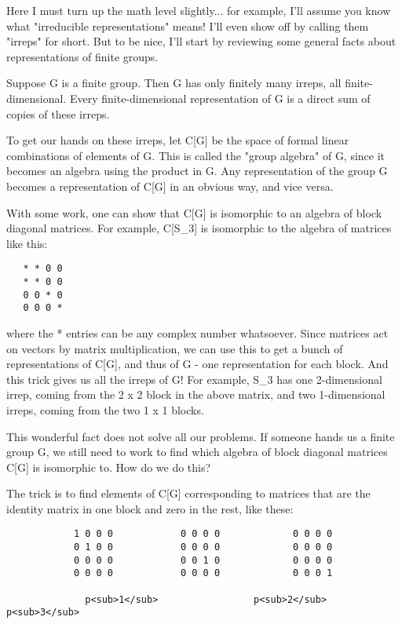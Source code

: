 Here I must turn up the math level slightly... for example, I'll assume
you know what "irreducible representations" means!  I'll even
show off by calling them "irreps" for short.  But to be nice,
I'll start by reviewing some general facts about representations of
finite groups.

Suppose G is a finite group.  Then G has only finitely many irreps, all
finite-dimensional.  Every finite-dimensional representation of G is a
direct sum of copies of these irreps.  

To get our hands on these irreps, let C[G] be the space of formal linear
combinations of elements of G.  This is called the "group
algebra" of G, since it becomes an algebra using the product in G.
Any representation of the group G becomes a representation of C[G] in an
obvious way, and vice versa.

With some work, one can show that C[G] is isomorphic to an algebra
of block diagonal matrices.  For example, C[S_{3}] is isomorphic to the
algebra of matrices like this:

\begin{verbatim}
   * * 0 0 
   * * 0 0
   0 0 * 0 
   0 0 0 *
\end{verbatim}
    
where the * entries can be any complex number whatsoever.  Since
matrices act on vectors by matrix multiplication, we can use this to get
a bunch of representations of C[G], and thus of G - one representation
for each block.  And this trick gives us all the irreps of G!  For
example, S_{3} has one 2-dimensional irrep, coming from the 2 x
2 block in the above matrix, and two 1-dimensional irreps, coming from
the two 1 x 1 blocks.

This wonderful fact does not solve all our problems.  If someone hands
us a finite group G, we still need to work to find which algebra of block
diagonal matrices C[G] is isomorphic to.  How do we do this?  

The trick is to find elements of C[G] corresponding to matrices that
are the identity matrix in one block and zero in the rest, like these:

\begin{verbatim}
            1 0 0 0            0 0 0 0             0 0 0 0 
            0 1 0 0            0 0 0 0             0 0 0 0 
            0 0 0 0            0 0 1 0             0 0 0 0 
            0 0 0 0            0 0 0 0             0 0 0 1

              p<sub>1</sub>                 p<sub>2</sub>                  p<sub>3</sub>
\end{verbatim}
    
